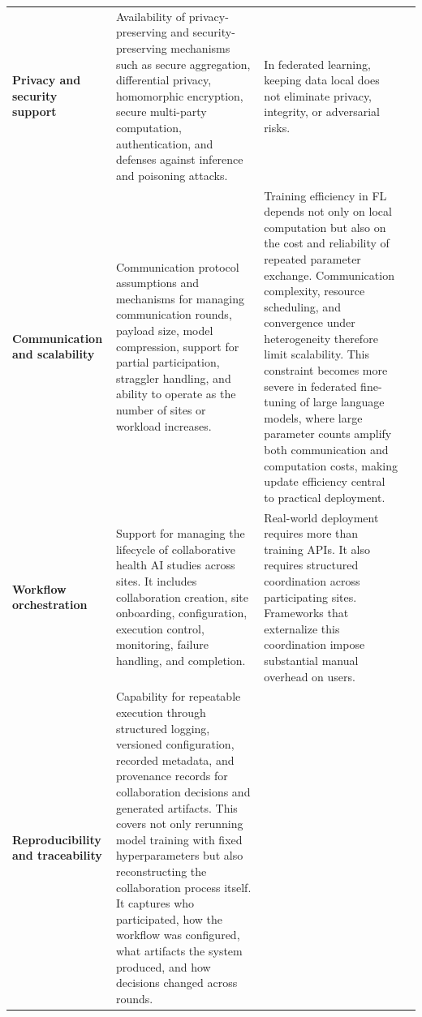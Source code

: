 \documentclass[preprint,5p, 10pt, times]{elsarticle}
\begin{document}
\begin{table}[t]
\begin{tabularx}{\textwidth}{
>{\raggedright\arraybackslash}p{2.2cm}
>{\raggedright\arraybackslash}X
>{\raggedright\arraybackslash}X
>{\centering\arraybackslash}p{1.1cm}}
\textbf{Privacy and security support}
& Availability of privacy-preserving and security-preserving mechanisms such as secure aggregation, differential privacy, homomorphic encryption, secure multi-party computation, authentication, and defenses against inference and poisoning attacks.
& In federated learning, keeping data local does not eliminate privacy, integrity, or adversarial risks.
& \cite{jimenez2026security, zhao2025federation,eden2025scoping,papadopoulos2021privacy} \\
\addlinespace[4pt]

\textbf{Communication and scalability}
& Communication protocol assumptions and mechanisms for managing communication rounds, payload size, model compression, support for partial participation, straggler handling, and ability to operate as the number of sites or workload increases. 
& Training efficiency in FL depends not only on local computation but also on the cost and reliability of repeated parameter exchange. Communication complexity, resource scheduling, and convergence under heterogeneity therefore limit scalability. This constraint becomes more severe in federated fine-tuning of large language models, where large parameter counts amplify both communication and computation costs, making update efficiency central to practical deployment.

& \cite{che2025llm, kaushal2025weighted,song2025optimizing,jing2026review,chai2024survey}\\
\addlinespace[4pt]

\textbf{Workflow orchestration}
& Support for managing the lifecycle of collaborative health AI studies across sites. It includes collaboration creation, site onboarding, configuration, execution control, monitoring, failure handling, and completion.
& Real-world deployment requires more than training APIs. It also requires structured coordination across participating sites. Frameworks that externalize this coordination impose substantial manual overhead on users.
& \cite{schlegel2026lowering,eden2025scoping} \\
\addlinespace[4pt]

\textbf{Reproducibility and traceability}
& Capability for repeatable execution through structured logging, versioned configuration, recorded metadata, and provenance records for collaboration decisions and generated artifacts. 
This covers not only rerunning model training with fixed hyperparameters but also reconstructing the collaboration process itself. It captures who participated, how the workflow was configured, what artifacts the system produced, and how decisions changed across rounds. 


\end{tabularx}
\end{table}
\end{document}
